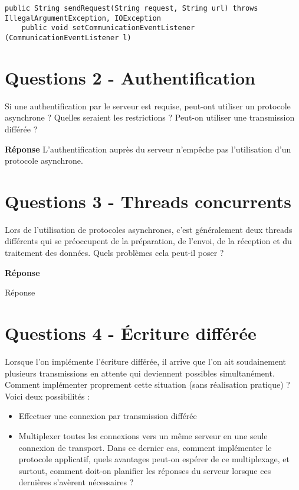 \documentclass[francais,12pt]{article}
\begin{document}
	\begin{lstlisting}[style=javaCode]
	public String sendRequest(String request, String url) throws IllegalArgumentException, IOException 
	public void setCommunicationEventListener (CommunicationEventListener l) 
	\end{lstlisting}
	
	\section*{Questions 2 - Authentification}
	Si une authentification par le serveur est requise, peut-ont utiliser un protocole asynchrone ? Quelles seraient les restrictions ? Peut-on utiliser une transmission différée ?
	
	
	{\color[rgb]{0,0.5,0.23}\textbf{Réponse}}
	L'authentification auprès du serveur n'empêche pas l'utilisation d'un protocole asynchrone. 
	
	
	\section*{Questions 3 - Threads concurrents}
	Lors de l'utilisation de protocoles asynchrones, c'est généralement deux threads différents qui se préoccupent de la préparation, de l'envoi, de la réception et du traitement des données. Quels problèmes cela peut-il poser ?
	
	{\color[rgb]{0,0.5,0.23}\textbf{Réponse}}
	
	Réponse
	
	\section*{Questions 4 - Écriture différée}    
	Lorsque l'on implémente l'écriture différée, il arrive que l'on ait soudainement plusieurs transmissions en attente qui deviennent possibles simultanément. Comment implémenter proprement cette situation (sans réalisation pratique) ? Voici deux possibilités :
	\begin{itemize}
		\item Effectuer une connexion par transmission différée
		\item Multiplexer toutes les connexions vers un même serveur en une seule connexion de transport. Dans ce dernier cas, comment implémenter le protocole applicatif, quels avantages peut-on espérer de ce multiplexage, et surtout, comment doit-on planifier les réponses du serveur lorsque ces dernières s'avèrent nécessaires ?
	\end{itemize}
	
\end{document}
